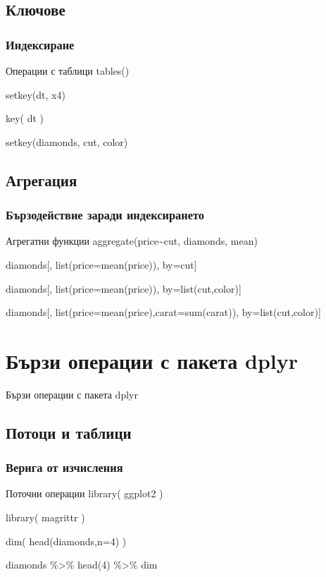 \documentclass{beamer}
\begin{document}
\subsection{Ключове}

\begin{frame}
\frametitle{Индексиране}
\begin{block}{Операции с таблици}
tables()

setkey(dt, x4)

key( dt )

setkey(diamonds, cut, color)
\end{block}
\end{frame}

\subsection{Агрегация}

\begin{frame}
\frametitle{Бързодействие заради индексирането}
\begin{block}{Агрегатни функции}
aggregate(price\textasciitilde cut, diamonds, mean)

diamonds[, list(price=mean(price)), by=cut]

diamonds[, list(price=mean(price)), by=list(cut,color)]

diamonds[, list(price=mean(price),carat=sum(carat)), by=list(cut,color)]
\end{block}
\end{frame}

\section{Бързи операции с пакета dplyr}

\begin{frame}
\center \huge{Бързи операции с пакета dplyr}
\end{frame}

\subsection{Потоци и таблици}

\begin{frame}
\frametitle{Верига от изчисления}
\begin{block}{Поточни операции}
library( ggplot2 )

library( magrittr )
 
dim( head(diamonds,n=4) )
 
diamonds \%>\% head(4) \%>\% dim
\end{block}
\end{frame}
\end{document}
